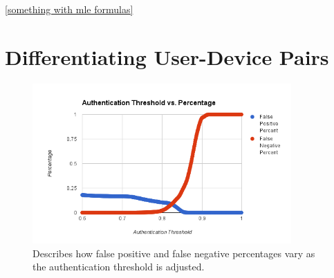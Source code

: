 \documentclass{acm_proc_article-sp}
\begin{document}
\ref{something with mle formulas}


\section{Differentiating User-Device Pairs}
\label{sec:differentiation}


\begin{figure}
\centering
\includegraphics[width=3.9in]{threshold_vs_percentages.png}
\caption{Describes how false positive and false negative percentages vary as the authentication threshold is adjusted.}
\label{fig:threshold_vs_percentages}
\end{figure}
\end{document}
